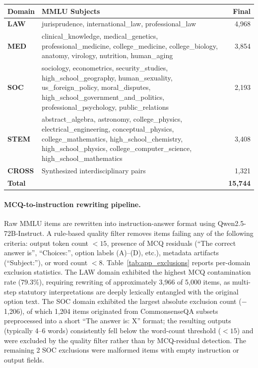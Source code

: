 \documentclass[a4paper,fleql]{cas-sc}
\begin{document}
\vspace{6pt plus 4pt minus 3pt}
\begin{center}
\begingroup
{}
\label{tab:app_data}
\renewcommand{\arraystretch}{1.4}
\begin{tabular}{l >{\raggedright\arraybackslash}p{9cm} r}
\toprule
\textbf{Domain} & \textbf{MMLU Subjects} & \textbf{Final} \\
\midrule
\textbf{LAW}
  & jurisprudence, international\_law, professional\_law & 4,968 \\
\midrule
\textbf{MED}
  & clinical\_knowledge, medical\_genetics, professional\_medicine,
    college\_medicine, college\_biology, anatomy, virology, nutrition,
    human\_aging & 3,854 \\
\midrule
\textbf{SOC}
  & sociology, econometrics, security\_studies,
    high\_school\_geography, human\_sexuality, us\_foreign\_policy,
    moral\_disputes, high\_school\_government\_and\_politics,
    professional\_psychology, public\_relations & 2,193 \\
\midrule
\textbf{STEM}
  & abstract\_algebra, astronomy, college\_physics,
    electrical\_engineering, conceptual\_physics, college\_mathematics,
    high\_school\_chemistry, high\_school\_physics,
    college\_computer\_science, high\_school\_mathematics & 3,408 \\
\midrule
\textbf{CROSS} & Synthesized interdisciplinary pairs & 1,321 \\
\midrule
\textbf{Total} & & \textbf{15,744} \\
\bottomrule
\end{tabular}
\endgroup
\end{center}
\vspace{6pt plus 4pt minus 3pt}

\paragraph{MCQ-to-instruction rewriting pipeline.}
Raw MMLU items are rewritten into instruction-answer format using
Qwen2.5-72B-Instruct. A rule-based quality filter removes items failing
any of the following criteria: output token count $< 15$, presence of MCQ
residuals (``The correct answer is'', ``Choices:'', option labels
(A)--(D), etc.), metadata artifacts (``Subject:''), or word count $< 8$.
Table~\ref{tab:app_exclusions} reports per-domain exclusion statistics.
The LAW domain exhibited the highest MCQ contamination rate (79.3\%),
requiring rewriting of approximately 3,966 of 5,000 items, as multi-step
statutory interpretations are deeply lexically entangled with the original
option text. The SOC domain exhibited the largest absolute exclusion count
($-$1,206), of which 1,204 items originated from CommonsenseQA subsets
preprocessed into a short ``The answer is: X'' format; the resulting
outputs (typically 4--6 words) consistently fell below the word-count
threshold ($< 15$) and were excluded by the quality filter rather than by
MCQ-residual detection. The remaining 2 SOC exclusions were malformed items
with empty instruction or output fields.
\end{document}
